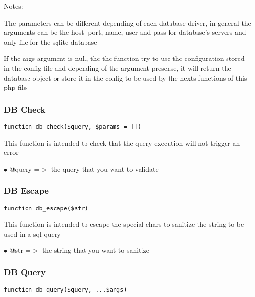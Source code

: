 \documentclass[a4paper]{article}
\begin{document}
Notes:

The parameters can be different depending of each database driver, in general the arguments can
be the host, port, name, user and pass for database's servers and only file for the sqlite database

If the args argument is null, the the function try to use the configuration stored in the config file
and depending of the argument presense, it will return the database object or store it in the config
to be used by the nexts functions of this php file

\hypertarget{toc85}{}
\subsubsection{DB Check}

\begin{lstlisting}
function db_check($query, $params = [])
\end{lstlisting}

This function is intended to check that the query execution will not trigger an error

\begin{compactitem}
\item[\color{myblue}$\bullet$] @query =$>$ the query that you want to validate
\end{compactitem}

\hypertarget{toc86}{}
\subsubsection{DB Escape}

\begin{lstlisting}
function db_escape($str)
\end{lstlisting}

This function is intended to escape the special chars to sanitize the string to be used
in a sql query

\begin{compactitem}
\item[\color{myblue}$\bullet$] @str =$>$ the string that you want to sanitize
\end{compactitem}

\hypertarget{toc87}{}
\subsubsection{DB Query}

\begin{lstlisting}
function db_query($query, ...$args)
\end{lstlisting}
\end{document}
